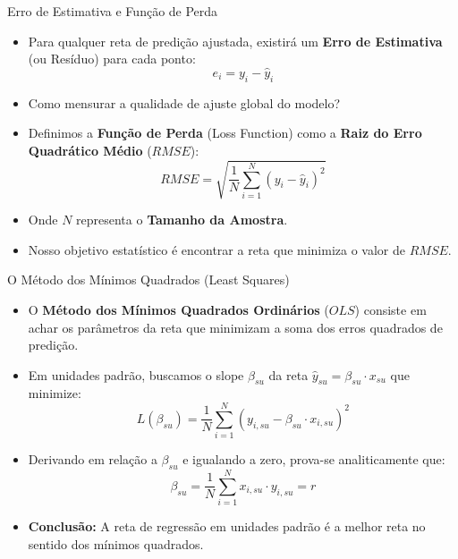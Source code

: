\begin{frame}{Erro de Estimativa e Função de Perda}
    \begin{itemize}
        \item Para qualquer reta de predição ajustada, existirá um \textbf{Erro de Estimativa} (ou Resíduo) para cada ponto:
        $$e_i = y_i - \hat{y}_i$$
        \item Como mensurar a qualidade de ajuste global do modelo?
        \item Definimos a \textbf{Função de Perda} (Loss Function) como a \textbf{Raiz do Erro Quadrático Médio} ($RMSE$):
        $$RMSE = \sqrt{\frac{1}{N} \sum_{i=1}^N (y_i - \hat{y}_i)^2}$$
        \item Onde $N$ representa o \textbf{Tamanho da Amostra}.
        \item Nosso objetivo estatístico é encontrar a reta que minimiza o valor de $RMSE$.
    \end{itemize}
\end{frame}

\begin{frame}{O Método dos Mínimos Quadrados (Least Squares)}
    \begin{itemize}
        \item O \textbf{Método dos Mínimos Quadrados Ordinários} ($OLS$) consiste em achar os parâmetros da reta que minimizam a soma dos erros quadrados de predição.
        \item Em unidades padrão, buscamos o slope $\beta_{su}$ da reta $\hat{y}_{su} = \beta_{su} \cdot x_{su}$ que minimize:
        $$L(\beta_{su}) = \frac{1}{N} \sum_{i=1}^N (y_{i,su} - \beta_{su} \cdot x_{i,su})^2$$
        \item Derivando em relação a $\beta_{su}$ e igualando a zero, prova-se analiticamente que:
        $$\beta_{su} = \frac{1}{N} \sum_{i=1}^N x_{i,su} \cdot y_{i,su} = r$$
        \item \textbf{Conclusão:} A reta de regressão em unidades padrão é a melhor reta no sentido dos mínimos quadrados.
    \end{itemize}
\end{frame}

